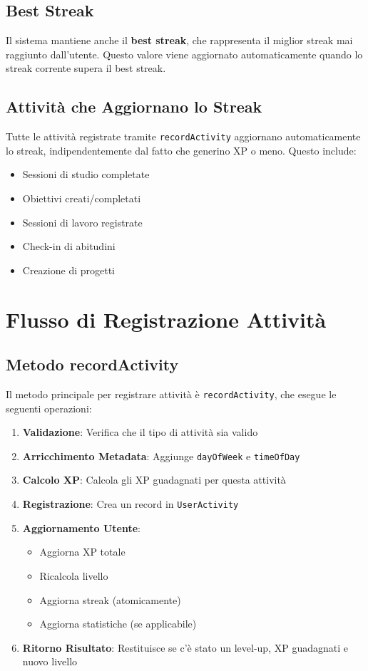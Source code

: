 \documentclass[11pt,a4paper]{article}
\begin{document}
\subsection{Best Streak}

Il sistema mantiene anche il \textbf{best streak}, che rappresenta il miglior streak mai raggiunto dall'utente. Questo valore viene aggiornato automaticamente quando lo streak corrente supera il best streak.

\subsection{Attività che Aggiornano lo Streak}

Tutte le attività registrate tramite \texttt{recordActivity} aggiornano automaticamente lo streak, indipendentemente dal fatto che generino XP o meno. Questo include:
\begin{itemize}
    \item Sessioni di studio completate
    \item Obiettivi creati/completati
    \item Sessioni di lavoro registrate
    \item Check-in di abitudini
    \item Creazione di progetti
\end{itemize}

\section{Flusso di Registrazione Attività}

\subsection{Metodo recordActivity}

Il metodo principale per registrare attività è \texttt{recordActivity}, che esegue le seguenti operazioni:

\begin{enumerate}
    \item \textbf{Validazione}: Verifica che il tipo di attività sia valido
    \item \textbf{Arricchimento Metadata}: Aggiunge \texttt{dayOfWeek} e \texttt{timeOfDay}
    \item \textbf{Calcolo XP}: Calcola gli XP guadagnati per questa attività
    \item \textbf{Registrazione}: Crea un record in \texttt{UserActivity}
    \item \textbf{Aggiornamento Utente}:
    \begin{itemize}
        \item Aggiorna XP totale
        \item Ricalcola livello
        \item Aggiorna streak (atomicamente)
        \item Aggiorna statistiche (se applicabile)
    \end{itemize}
    \item \textbf{Ritorno Risultato}: Restituisce se c'è stato un level-up, XP guadagnati e nuovo livello
\end{enumerate}
\end{document}
